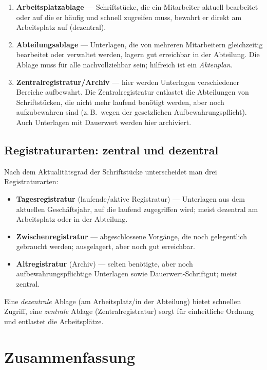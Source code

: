 \documentclass[11pt, a4paper]{article}
\begin{document}
\begin{enumerate}
  \item \textbf{Arbeitsplatzablage} --- Schriftstücke, die ein Mitarbeiter aktuell
    bearbeitet oder auf die er häufig und schnell zugreifen muss, bewahrt er direkt am
    Arbeitsplatz auf (dezentral).
  \item \textbf{Abteilungsablage} --- Unterlagen, die von mehreren Mitarbeitern
    gleichzeitig bearbeitet oder verwaltet werden, lagern gut erreichbar in der
    Abteilung. Die Ablage muss für alle nachvollziehbar sein; hilfreich ist ein
    \emph{Aktenplan}.
  \item \textbf{Zentralregistratur/Archiv} --- hier werden Unterlagen verschiedener
    Bereiche aufbewahrt. Die Zentralregistratur entlastet die Abteilungen von
    Schriftstücken, die nicht mehr laufend benötigt werden, aber noch aufzubewahren sind
    (z.\,B.\ wegen der gesetzlichen Aufbewahrungspflicht). Auch Unterlagen mit Dauerwert
    werden hier archiviert.
\end{enumerate}

\subsection{Registraturarten: zentral und dezentral}

Nach dem Aktualitätsgrad der Schriftstücke unterscheidet man drei Registraturarten:

\begin{itemize}
  \item \textbf{Tagesregistratur} (laufende/aktive Registratur) --- Unterlagen aus dem
    aktuellen Geschäftsjahr, auf die laufend zugegriffen wird; meist dezentral am
    Arbeitsplatz oder in der Abteilung.
  \item \textbf{Zwischenregistratur} --- abgeschlossene Vorgänge, die noch gelegentlich
    gebraucht werden; ausgelagert, aber noch gut erreichbar.
  \item \textbf{Altregistratur} (Archiv) --- selten benötigte, aber noch
    aufbewahrungspflichtige Unterlagen sowie Dauerwert-Schriftgut; meist zentral.
\end{itemize}

Eine \emph{dezentrale} Ablage (am Arbeitsplatz/in der Abteilung) bietet schnellen
Zugriff, eine \emph{zentrale} Ablage (Zentralregistratur) sorgt für einheitliche
Ordnung und entlastet die Arbeitsplätze.

\section{Zusammenfassung}
\end{document}
